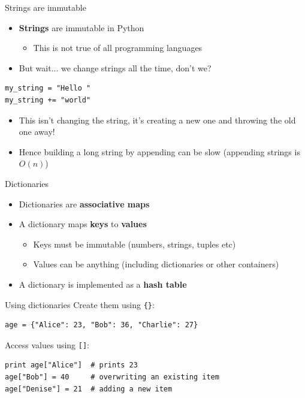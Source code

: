 \begin{frame}[fragile]{Strings are immutable}
	\begin{itemize}
		\pause\item \textbf{Strings} are immutable in Python
			\begin{itemize}
				\pause\item This is not true of all programming languages
			\end{itemize}
		\pause\item But wait... we change strings all the time, don't we?
	\end{itemize}
	\begin{lstlisting}
my_string = "Hello "
my_string += "world"
	\end{lstlisting}
	\begin{itemize}
		\pause\item This isn't changing the string, it's creating a new one and throwing the old one away!
		\pause\item Hence building a long string by appending can be slow (appending strings is $O(n)$)
	\end{itemize}
\end{frame}

\begin{frame}{Dictionaries}
	\begin{itemize}
		\pause\item Dictionaries are \textbf{associative maps}
		\pause\item A dictionary maps \textbf{keys} to \textbf{values}
			\begin{itemize}
				\pause\item Keys must be immutable (numbers, strings, tuples etc)
				\pause\item Values can be anything (including dictionaries or other containers)
			\end{itemize}
		\pause\item A dictionary is implemented as a \textbf{hash table}
	\end{itemize}		
\end{frame}

\begin{frame}[fragile]{Using dictionaries}
	\pause Create them using \lstinline|{}|:
	\begin{lstlisting}
age = {"Alice": 23, "Bob": 36, "Charlie": 27}
	\end{lstlisting}
	\pause Access values using \lstinline{[]}:
	\begin{lstlisting}
print age["Alice"]  # prints 23
age["Bob"] = 40     # overwriting an existing item
age["Denise"] = 21  # adding a new item
	\end{lstlisting}
\end{frame}

